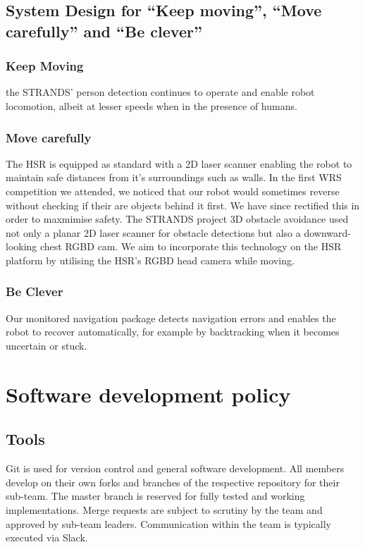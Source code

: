 \documentclass[runningheads,a4paper]{llncs}
\begin{document}
\subsection{System Design for “Keep moving”, “Move carefully” and “Be clever”}
\subsubsection{Keep Moving}
the STRANDS' person detection continues to operate and enable robot locomotion, albeit at lesser speeds when in the presence of humans.

\subsubsection{Move carefully}
The HSR is equipped as standard with a 2D laser scanner enabling the robot to maintain safe distances from it's surroundings such as walls. In the first WRS competition we attended, we noticed that our robot would sometimes reverse without checking if their are objects behind it first. We have since rectified this in order to maxmimise safety. The STRANDS project 3D obstacle avoidance used not only a planar 2D laser scanner for obstacle detections but also a downward-looking chest RGBD cam. We aim to incorporate this technology on the HSR platform by utilising the HSR's RGBD head camera while moving. 

\subsubsection{Be Clever}
Our monitored navigation package detects navigation errors and enables the robot to recover automatically, for example by backtracking when it becomes uncertain or stuck. 

\section{Software development policy}
\subsection{Tools}
Git is used for version control and general software development. All members develop on their own forks and branches of the respective repository for their sub-team. The master branch is reserved for fully tested and working implementations. Merge requests are subject to scrutiny by the team and approved by sub-team leaders. Communication within the team is typically executed via Slack.
\end{document}
